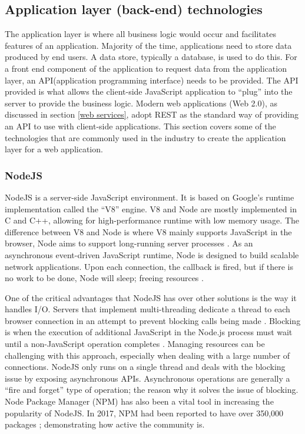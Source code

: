 \subsection{Application layer (back-end) technologies}
The application layer is where all business logic would occur and facilitates features of an application.
Majority of the time, applications need to store data produced by end users. A data store, typically a database, is
used to do this.
For a front end component of the application to request data from the application layer, an API(application programming interface) needs
to be provided. The API provided is what allows the client-side JavaScript application to ``plug'' into the server to provide the business
logic. 
Modern web applications (Web 2.0), as discussed in section \ref{web services}, adopt REST as the standard way of providing an API to use with client-side applications.
This section covers some of the technologies that are commonly used in the industry to create the application layer for a web application.

\subsubsection{NodeJS}
NodeJS is a server-side JavaScript environment. It is based on Google's runtime implementation called the ``V8'' engine.
V8 and Node are mostly implemented in C and C++, allowing for high-performance runtime with low memory usage.
The difference between V8 and Node is where V8 mainly supports JavaScript in the browser, Node aims to support long-running 
server processes \cite{tilkov2010node}.
As an asynchronous event-driven JavaScript runtime, Node is designed to build scalable network applications. 
Upon each connection, the callback is fired, but if there is no work to be done, Node will sleep; freeing resources \cite{nodejs2016}.

One of the critical advantages that NodeJS has over other solutions is the way it handles I/O.
Servers that implement multi-threading dedicate a thread to each browser connection in an attempt to prevent blocking calls being made \cite{frees2015place}.
Blocking is when the execution of additional JavaScript in the Node.js process must wait until a non-JavaScript operation completes \cite{nodejs2019blocking}. 
Managing resources can be challenging with this approach, especially when dealing with a large number of connections.
NodeJS only runs on a single thread and deals with the blocking issue by exposing asynchronous APIs.
Asynchronous operations are generally a ``fire and forget'' type of operation; the reason why it solves the issue of blocking.
Node Package Manager (NPM) has also been a vital tool in increasing the popularity of NodeJS.
In 2017, NPM had been reported to have over 350,000 packages \cite{linux2016stateofnpm}; demonstrating how active the community is.

